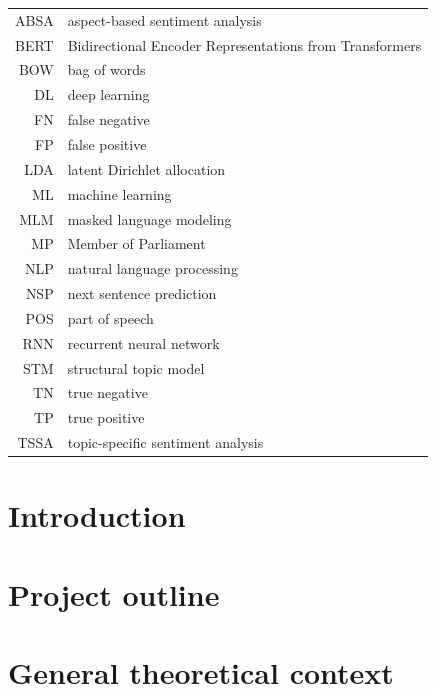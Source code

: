 \documentclass[12pt]{article}
\begin{document}
\begin{tabular}{rl}
  ABSA & aspect-based sentiment analysis \\
  BERT & Bidirectional Encoder Representations from Transformers \\ 
  BOW & bag of words \\
  DL & deep learning \\
  FN & false negative \\
  FP & false positive \\
  LDA & latent Dirichlet allocation \\
  ML & machine learning \\
  MLM & masked language modeling \\
  MP & Member of Parliament \\
  NLP & natural language processing \\
  NSP & next sentence prediction \\
  POS & part of speech \\
  RNN & recurrent neural network \\
  STM & structural topic model \\
  TN & true negative \\
  TP & true positive \\
  TSSA & topic-specific sentiment analysis
\end{tabular}

\vspace{2cm}
\listoffigures
\vspace{2cm}
\listoftables

\newpage


    
\section{Introduction}
\label{intro}


\section{Project outline}
\label{project}


\section{General theoretical context}
\label{theory}

\end{document}
